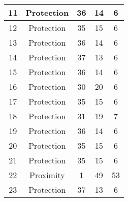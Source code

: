 \documentclass[results.tex]{subfiles}
\begin{document}
\begin{center}
\begin{tabular}{| c || c | c | c | c |}
            \hline
            11                      & Protection                   & 36                     & 14                      & 6                    \\
            \hline
            12                      & Protection                   & 35                     & 15                      & 6                    \\
            \hline
            13                      & Protection                   & 36                     & 14                      & 6                    \\
            \hline
            14                      & Protection                   & 37                     & 13                      & 6                    \\
            \hline
            15                      & Protection                   & 36                     & 14                      & 6                    \\
            \hline
            16                      & Protection                   & 30                     & 20                      & 6                    \\
            \hline
            17                      & Protection                   & 35                     & 15                      & 6                    \\
            \hline
            18                      & Protection                   & 31                     & 19                      & 7                    \\
            \hline
            19                      & Protection                   & 36                     & 14                      & 6                    \\
            \hline
            20                      & Protection                   & 35                     & 15                      & 6                    \\
            \hline
            21                      & Protection                   & 35                     & 15                      & 6                    \\
            \hline
            22                      & Proximity                    & 1                      & 49                      & 53                   \\
            \hline
            23                      & Protection                   & 37                     & 13                      & 6                    \\

\end{tabular}
\end{center}
\end{document}
